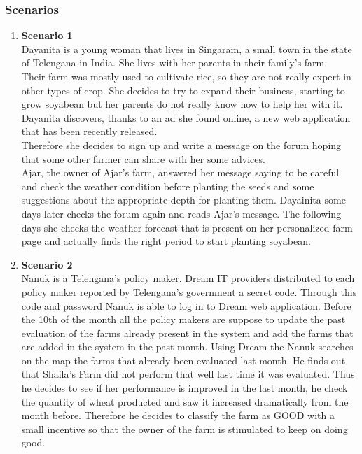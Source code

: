 \subsubsection{Scenarios}
\begin{enumerate}
    \item \textbf{Scenario 1}\\
    Dayanita is a young woman that lives in Singaram, a small town in the state of Telengana in India. 
    She lives with her parents in their family's farm. \\
    Their farm was mostly used to cultivate rice, so they are not really expert in other types of crop. She decides to try to expand their business, starting to grow 
    soyabean but her parents do not really know how to help her with it. \\
    Dayanita discovers, thanks to an ad she found online, a new web application that has been recently released. \\
    Therefore she decides to sign up and write a message on the forum hoping that some other farmer can share with her some advices.\\
    Ajar, the owner of Ajar's farm, answered her message saying to be careful and check the weather condition before planting the seeds and some suggestions 
    about the appropriate depth for planting them. 
    Dayainita some days later checks the forum again and reads Ajar's message. 
    The following days she checks the weather forecast that is present on her personalized farm page and actually 
    finds the right period to start planting soyabean.



    \item \textbf{Scenario 2}\\
    Nanuk is a Telengana’s policy maker. Dream IT providers distributed to each policy maker 
    reported by Telengana's government a secret code. Through this code 
    and password Nanuk is able to log in to Dream web application. 
    Before the 10th of the month all the policy makers are suppose to update the past evaluation 
    of the farms already present in 
    the system and add the farms that are added in the system in the past month.
    Using Dream the Nanuk searches on the map the farms that already been evaluated last month. 
    He finds out that Shaila's Farm did 
    not perform that well last time it was evaluated.
    Thus he decides to see if her performance is improved in the last month, he check the quantity 
    of wheat producted and 
    saw it increased dramatically from the month before.
    Therefore he decides to classify the farm as GOOD with a small incentive so that the owner 
    of the farm is stimulated to keep on doing good.
    

\end{enumerate}
